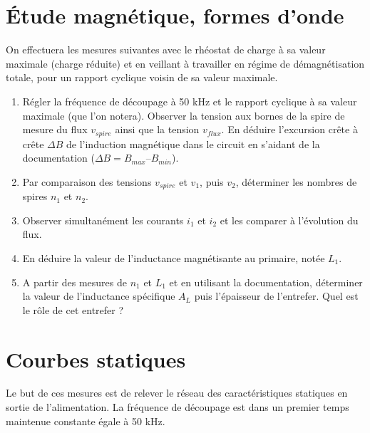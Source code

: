 \section{Étude magnétique, formes d’onde}

On effectuera les mesures suivantes avec le rhéostat de charge à sa valeur maximale (charge réduite) et en veillant à travailler en régime de démagnétisation totale, pour un rapport cyclique voisin de sa valeur maximale.

\begin{enumerate}
\item Régler la fréquence de découpage à 50 kHz et le rapport cyclique à sa valeur maximale (que l’on notera). Observer la tension aux bornes de la spire de mesure du flux $v_{spire}$ ainsi que la tension $v_{flux}$. En déduire l’excursion crête à crête $\Delta B$ de l'induction magnétique dans le circuit en s’aidant de la documentation ($\Delta B = B_{max} – B_{min}$).
\item Par comparaison des tensions $v_{spire}$ et $v_1$, puis $v_2$, déterminer les nombres de spires $n_1$ et $n_2$.
\item Observer simultanément les courants $i_1$ et $i_2$ et les comparer à l’évolution du flux.
\item En déduire la valeur de l’inductance magnétisante au primaire, notée $L_1$.
\item A partir des mesures de $n_1$ et $L_1$ et en utilisant la documentation, déterminer la valeur de l’inductance spécifique $A_L$ puis l’épaisseur de l’entrefer. Quel est le rôle de cet entrefer ?
\end{enumerate}

\newpage
\section{Courbes statiques}

Le but de ces mesures est de relever le réseau des caractéristiques statiques en sortie de l’alimentation. La fréquence de découpage est dans un premier temps maintenue constante égale à 50 kHz.


